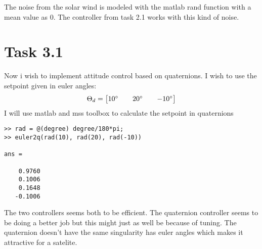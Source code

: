 \documentclass[11pt]{article}
\begin{document}
The noise from the solar wind is modeled with the matlab rand function with a mean value as 0. The controller from task 2.1 works with this kind of noise.


\section*{Task 3.1}
Now i wish to implement attitude control based on quaternions. I wish to use the setpoint given in euler angles:
\[\Theta_d = \begin{bmatrix} 10\degree && 20\degree && -10\degree \end{bmatrix} \]
I will use matlab and mss toolbox to calculate the setpoint in quaternions
\begin{lstlisting}[frame=single]
>> rad = @(degree) degree/180*pi;
>> euler2q(rad(10), rad(20), rad(-10))

ans =

    0.9760
    0.1006
    0.1648
   -0.1006

\end{lstlisting}
The two controllers seems both to be efficient. The quaternion controller seems to be doing a better job but this might just as well be because of tuning. The quaternion doesn't have the same singularity has euler angles which makes it attractive for a satelite.
\end{document}

